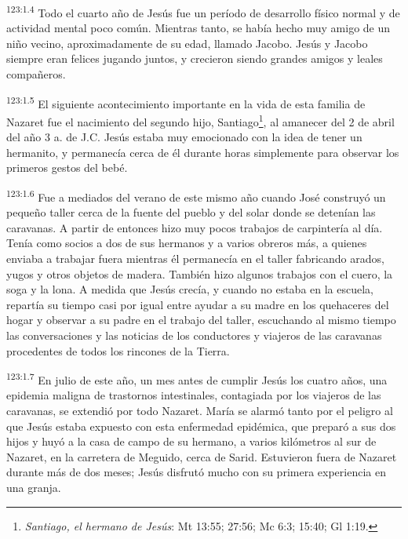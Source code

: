 \par
\textsuperscript{123:1.4} Todo el cuarto año de Jesús fue un período de desarrollo físico normal y de actividad mental poco común. Mientras tanto, se había hecho muy amigo de un niño vecino, aproximadamente de su edad, llamado Jacobo. Jesús y Jacobo siempre eran felices jugando juntos, y crecieron siendo grandes amigos y leales compañeros.

\par
\textsuperscript{123:1.5} El siguiente acontecimiento importante en la vida de esta familia de Nazaret fue el nacimiento del segundo hijo, Santiago\footnote{\textit{Santiago, el hermano de Jesús}: Mt 13:55; 27:56; Mc 6:3; 15:40; Gl 1:19.}, al amanecer del 2 de abril del año 3 a. de J.C. Jesús estaba muy emocionado con la idea de tener un hermanito, y permanecía cerca de él durante horas simplemente para observar los primeros gestos del bebé.

\par
\textsuperscript{123:1.6} Fue a mediados del verano de este mismo año cuando José construyó un pequeño taller cerca de la fuente del pueblo y del solar donde se detenían las caravanas. A partir de entonces hizo muy pocos trabajos de carpintería al día. Tenía como socios a dos de sus hermanos y a varios obreros más, a quienes enviaba a trabajar fuera mientras él permanecía en el taller fabricando arados, yugos y otros objetos de madera. También hizo algunos trabajos con el cuero, la soga y la lona. A medida que Jesús crecía, y cuando no estaba en la escuela, repartía su tiempo casi por igual entre ayudar a su madre en los quehaceres del hogar y observar a su padre en el trabajo del taller, escuchando al mismo tiempo las conversaciones y las noticias de los conductores y viajeros de las caravanas procedentes de todos los rincones de la Tierra.

\par
\textsuperscript{123:1.7} En julio de este año, un mes antes de cumplir Jesús los cuatro años, una epidemia maligna de trastornos intestinales, contagiada por los viajeros de las caravanas, se extendió por todo Nazaret. María se alarmó tanto por el peligro al que Jesús estaba expuesto con esta enfermedad epidémica, que preparó a sus dos hijos y huyó a la casa de campo de su hermano, a varios kilómetros al sur de Nazaret, en la carretera de Meguido, cerca de Sarid. Estuvieron fuera de Nazaret durante más de dos meses; Jesús disfrutó mucho con su primera experiencia en una granja.

